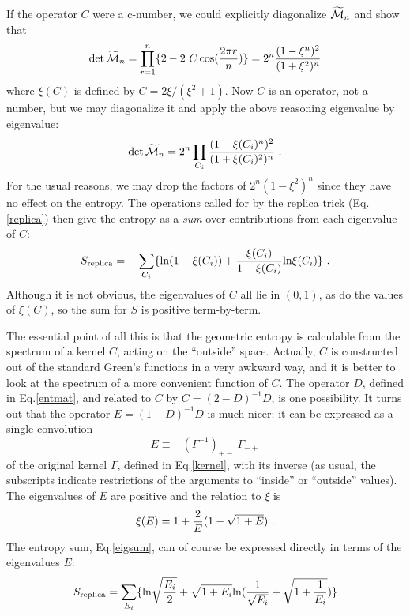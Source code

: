 \documentclass[12pt]{article}
\begin{document}
If the operator $C$ were a c-number, we could explicitly diagonalize
$\widetilde{\cal M}_n$ and show that
\begin{equation}
\det {\widetilde{\cal M}_n} =\prod_{r=1}^n\{2-2~C \cos({2\pi r\over n})\}
		= 2^n{(1 - \xi^n)^2 \over (1+\xi^2)^n}
\end{equation}
where $\xi(C)$ is defined by $C = 2\xi /( \xi^2 +1)$.
Now $C$ is an operator, not a number, but we may diagonalize it
and apply the above reasoning eigenvalue by eigenvalue:
\begin{equation}
\det {\widetilde{\cal M}_n} = 2^n\prod_{C_i}{(1 - \xi(C_i)^n)^2 \over
		(1+\xi(C_i)^2)^n}~.
\end{equation}
For the usual reasons, we may drop the factors of $2^n(1-\xi^2)^n$ since
they have no effect on the entropy. The operations called for by the replica
trick (Eq.\ref{replica}) then give the entropy as
a {\it sum} over contributions from each eigenvalue of $C$:
\begin{equation}
S_{\rm replica} = -\sum_{C_i}\{{\rm ln}(1-\xi(C_i)) +
{\xi(C_i)\over 1-\xi(C_i)} {\rm ln}\xi(C_i)\}~.
\label{eigsum}
\end{equation}
Although it is not obvious, the eigenvalues of $C$ all lie in $(0,1)$,
as do the values of $\xi(C)$, so the sum for $S$ is positive term-by-term.

The essential point of all this is that the geometric entropy is calculable
from the spectrum of a kernel $C$, acting on the ``outside'' space. Actually,
$C$ is constructed out of the standard Green's functions in a very awkward
way, and it is better to look at the spectrum of a more convenient function of
$C$. The operator $D$, defined in Eq.\ref{entmat}, and related to $C$ by
$C=(2-D)^{-1}D$, is one possibility. It turns out that the operator
$E=(1-D)^{-1}D$ is much nicer: it can be expressed as a single convolution
\begin{equation}
E \equiv -(\Gamma^{-1})_{+-}~\Gamma_{-+}
\label{newker}
\end{equation}
of the original kernel $\Gamma$,
defined in Eq.\ref{kernel}, with its inverse (as usual, the subscripts
indicate restrictions of the arguments to ``inside'' or ``outside'' values).
The eigenvalues of $E$ are positive and the relation to $\xi$ is
\begin{equation}
\xi(E) = 1+ {2\over E}(1-\sqrt{1+E})~.
\end{equation}
The entropy sum, Eq.\ref{eigsum}, can of course be expressed directly in terms
of the eigenvalues $E$:
\begin{equation}
S_{\rm replica} = \sum_{E_i}
\{{\rm \ln}\sqrt{{E_i\over 2}}+\sqrt{1+E_i}
{\rm \ln}({1\over\sqrt{E_i}}+\sqrt{1+
{1\over E_i}})  \}
\label{entsum}
\end{equation}
\end{document}
